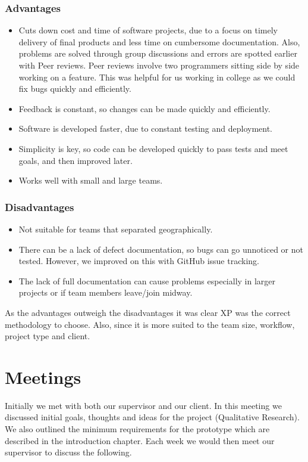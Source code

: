 \subsubsection{Advantages}
\begin{itemize}
  \item Cuts down cost and time of software projects, due to a focus on timely delivery of final products and less time on cumbersome documentation. Also, problems are solved through group discussions and errors are spotted earlier with Peer reviews. Peer reviews involve two programmers sitting side by side working on a feature. This was helpful for us working in college as we could fix bugs quickly and efficiently.
  \item Feedback is constant, so changes can be made quickly and efficiently.
  \item Software is developed faster, due to constant testing and deployment.
  \item Simplicity is key, so code can be developed quickly to pass tests and meet goals, and then improved later.
  \item Works well with small and large teams.
\end{itemize}

\subsubsection{Disadvantages}
\begin{itemize}
  \item Not suitable for teams that separated geographically.
  \item There can be a lack of defect documentation, so bugs can go unnoticed or not tested. However, we improved on this with GitHub issue tracking.
  \item The lack of full documentation can cause problems especially in larger projects or if team members leave/join midway.
\end{itemize}

As the advantages outweigh the disadvantages it was clear XP was the correct methodology to choose. Also, since it is more suited to the team size, workflow, project type and client.

\section{Meetings}
Initially we met with both our supervisor and our client. In this meeting we discussed initial goals, thoughts and ideas for the project (Qualitative Research). We also outlined the minimum requirements for the prototype which are described in the introduction chapter. Each week we would then meet our supervisor to discuss the following.

